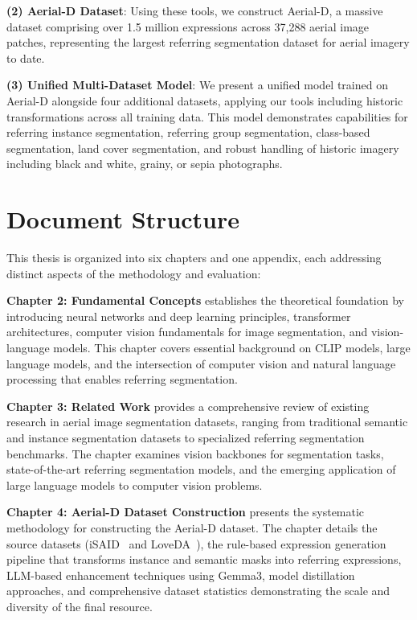\textbf{(2) Aerial-D Dataset}: Using these tools, we construct Aerial-D, a massive dataset comprising over 1.5 million expressions across 37,288 aerial image patches, representing the largest referring segmentation dataset for aerial imagery to date.

\textbf{(3) Unified Multi-Dataset Model}: We present a unified model trained on Aerial-D alongside four additional datasets, applying our tools including historic transformations across all training data. This model demonstrates capabilities for referring instance segmentation, referring group segmentation, class-based segmentation, land cover segmentation, and robust handling of historic imagery including black and white, grainy, or sepia photographs.
\section{Document Structure}

This thesis is organized into six chapters and one appendix, each addressing distinct aspects of the methodology and evaluation:

\textbf{Chapter 2: Fundamental Concepts} establishes the theoretical foundation by introducing neural networks and deep learning principles, transformer architectures, computer vision fundamentals for image segmentation, and vision-language models. This chapter covers essential background on CLIP models, large language models, and the intersection of computer vision and natural language processing that enables referring segmentation.

\textbf{Chapter 3: Related Work} provides a comprehensive review of existing research in aerial image segmentation datasets, ranging from traditional semantic and instance segmentation datasets to specialized referring segmentation benchmarks. The chapter examines vision backbones for segmentation tasks, state-of-the-art referring segmentation models, and the emerging application of large language models to computer vision problems.

\textbf{Chapter 4: Aerial-D Dataset Construction} presents the systematic methodology for constructing the Aerial-D dataset. The chapter details the source datasets (iSAID~\cite{zamir2019isaid} and LoveDA~\cite{wang2021loveda}), the rule-based expression generation pipeline that transforms instance and semantic masks into referring expressions, LLM-based enhancement techniques using Gemma3, model distillation approaches, and comprehensive dataset statistics demonstrating the scale and diversity of the final resource.

